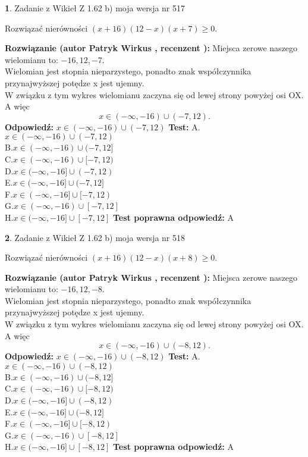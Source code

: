 \documentclass[12pt, a4paper]{article}
\theoremstyle{definition} %
\newtheorem{zad}{}
\newcommand{\zadStart}[1]{\begin{zad}#1\newline}
\newcommand{\zadStop}{\end{zad}}
\newcommand{\rozwStart}[2]{\noindent \textbf{Rozwiązanie (autor #1 , recenzent #2): }\newline}
\newcommand{\rozwStop}{\newline}
\newcommand{\odpStart}{\noindent \textbf{Odpowiedź:}\newline}
\newcommand{\odpStop}{\newline}
\newcommand{\testStart}{\noindent \textbf{Test:}\newline}
\newcommand{\testStop}{\newline}
\newcommand{\kluczStart}{\noindent \textbf{Test poprawna odpowiedź:}\newline}
\newcommand{\kluczStop}{\newline}
\begin{document}
\zadStart{Zadanie z Wikieł Z 1.62 b) moja wersja nr 517}

Rozwiązać nierówności $(x+16)(12-x)(x+7)\ge0$.
\zadStop
\rozwStart{Patryk Wirkus}{}
Miejsca zerowe naszego wielomianu to: $-16, 12, -7$.\\
Wielomian jest stopnia nieparzystego, ponadto znak współczynnika przy\linebreak najwyższej potędze x jest ujemny.\\ W związku z tym wykres wielomianu zaczyna się od lewej strony powyżej osi OX. A więc $$x \in (-\infty,-16) \cup (-7,12).$$
\rozwStop
\odpStart
$x \in (-\infty,-16) \cup (-7,12)$
\odpStop
\testStart
A.$x \in (-\infty,-16) \cup (-7,12)$\\
B.$x \in (-\infty,-16) \cup (-7,12]$\\
C.$x \in (-\infty,-16) \cup [-7,12)$\\
D.$x \in (-\infty,-16] \cup (-7,12)$\\
E.$x \in (-\infty,-16] \cup (-7,12]$\\
F.$x \in (-\infty,-16] \cup [-7,12)$\\
G.$x \in (-\infty,-16) \cup [-7,12]$\\
H.$x \in (-\infty,-16] \cup [-7,12]$
\testStop
\kluczStart
A
\kluczStop



\zadStart{Zadanie z Wikieł Z 1.62 b) moja wersja nr 518}

Rozwiązać nierówności $(x+16)(12-x)(x+8)\ge0$.
\zadStop
\rozwStart{Patryk Wirkus}{}
Miejsca zerowe naszego wielomianu to: $-16, 12, -8$.\\
Wielomian jest stopnia nieparzystego, ponadto znak współczynnika przy\linebreak najwyższej potędze x jest ujemny.\\ W związku z tym wykres wielomianu zaczyna się od lewej strony powyżej osi OX. A więc $$x \in (-\infty,-16) \cup (-8,12).$$
\rozwStop
\odpStart
$x \in (-\infty,-16) \cup (-8,12)$
\odpStop
\testStart
A.$x \in (-\infty,-16) \cup (-8,12)$\\
B.$x \in (-\infty,-16) \cup (-8,12]$\\
C.$x \in (-\infty,-16) \cup [-8,12)$\\
D.$x \in (-\infty,-16] \cup (-8,12)$\\
E.$x \in (-\infty,-16] \cup (-8,12]$\\
F.$x \in (-\infty,-16] \cup [-8,12)$\\
G.$x \in (-\infty,-16) \cup [-8,12]$\\
H.$x \in (-\infty,-16] \cup [-8,12]$
\testStop
\kluczStart
A
\kluczStop
\end{document}
